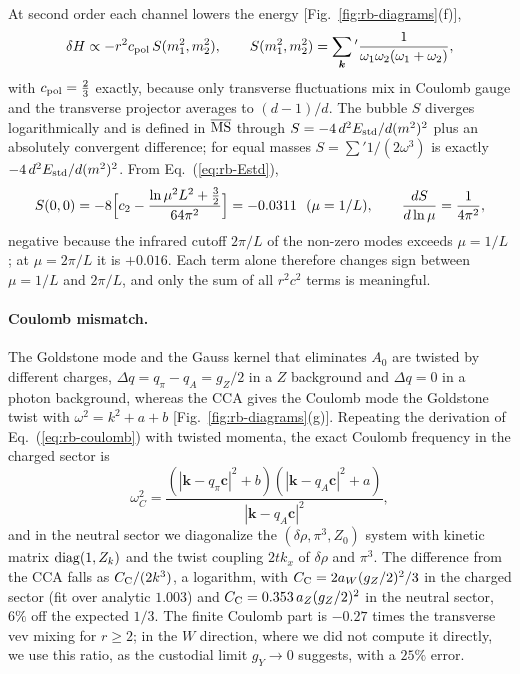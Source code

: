 At second order each channel lowers the energy [Fig.~\ref{fig:rb-diagrams}(f)],
\begin{equation}
\delta H\propto-r^2c_{\rm pol}\,S(m_1^2,m_2^2),\qquad S(m_1^2,m_2^2)=\sum_{\bm k}{}'\frac{1}{\omega_1\omega_2(\omega_1+\omega_2)},
\label{eq:rb-bubble}
\end{equation}
with $c_{\rm pol}=\frac23$ exactly, because only transverse fluctuations mix in Coulomb gauge and the transverse projector averages to $(d-1)/d$.
The bubble $S$ diverges logarithmically and is defined in $\overline{\mathrm{MS}}$ through $S=-4\,d^2E_{\rm std}/d(m^2)^2$ plus an absolutely convergent difference; for equal masses $S=\sum'1/(2\omega^3)$ is exactly $-4\,d^2E_{\rm std}/d(m^2)^2$.
From Eq.~(\ref{eq:rb-Estd}),
\begin{equation}
S(0,0)=-8\Bigl[c_2-\frac{\ln\mu^2L^2+\frac32}{64\pi^2}\Bigr]=-0.0311\ \ (\mu=1/L),\qquad \frac{dS}{d\ln\mu}=\frac{1}{4\pi^2}, %
\label{eq:rb-S0}
\end{equation}
negative because the infrared cutoff $2\pi/L$ of the non-zero modes exceeds $\mu=1/L$; at $\mu=2\pi/L$ it is $+0.016$. %
Each term alone therefore changes sign between $\mu=1/L$ and $2\pi/L$, and only the sum of all $r^2c^2$ terms is meaningful.

\paragraph{Coulomb mismatch.}
The Goldstone mode and the Gauss kernel that eliminates $A_0$ are twisted by different charges, $\Delta q=q_\pi-q_A=g_Z/2$ in a $Z$ background and $\Delta q=0$ in a photon background, whereas the CCA gives the Coulomb mode the Goldstone twist with $\omega^2=k^2+a+b$ [Fig.~\ref{fig:rb-diagrams}(g)].
Repeating the derivation of Eq.~(\ref{eq:rb-coulomb}) with twisted momenta, the exact Coulomb frequency in the charged sector is
\begin{equation}
\omega_C^2=\frac{(|\bm k-q_\pi\bm c|^2+b)(|\bm k-q_A\bm c|^2+a)}{|\bm k-q_A\bm c|^2},
\label{eq:rb-omegaC-twist}
\end{equation}
and in the neutral sector we diagonalize the $(\delta\rho,\pi^3,Z_0)$ system with kinetic matrix ${\rm diag}(1,Z_k)$ and the twist coupling $2tk_x$ of $\delta\rho$ and $\pi^3$.
The difference from the CCA falls as $C_{\rm C}/(2k^3)$, a logarithm, with $C_{\rm C}=2a_W(g_Z/2)^2/3$ in the charged sector (fit over analytic $1.003$) and $C_{\rm C}=0.353\,a_Z(g_Z/2)^2$ in the neutral sector, $6\%$ off the expected $1/3$. %
The finite Coulomb part is $-0.27$ times the transverse vev mixing for $r\ge2$; in the $W$ direction, where we did not compute it directly, we use this ratio, as the custodial limit $g_Y\to0$ suggests, with a $25\%$ error. %

